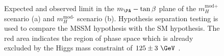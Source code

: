 \begin{figure}[tbh]
\caption{Expected and observed limit in the $m_{\PA}-\tan\beta$ plane of the
$m_H^{\text{mod+}}$ scenario (a) and $m_H^{\text{mod-}}$ scenario (b). Hypothesis
separation testing is used to compare the \ac{MSSM} hypothesis with the SM
hypothesis. The red area indicates the region of phase space which is already
excluded by the Higgs mass constraint of $125\pm3~\GeV$ \cite{HIG-13-021}.}
\label{fig:mhmodpmhmodm}
\end{figure}

